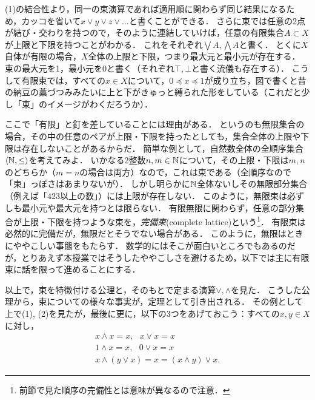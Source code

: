 \documentclass[11pt,a4paper, dvipdfmx]{jsarticle}
\begin{document}
(1)の結合性より，同一の束演算であれば適用順に関わらず同じ結果になるため，カッコを省いて$x \vee y \vee z \vee \dots$と書くことができる．
さらに束では任意の2点が結び・交わりを持つので，そのように連結していけば，任意の有限集合$A \subset X$が上限と下限を持つことがわかる．
これをそれぞれ$\bigvee A, \bigwedge A$と書く．
とくに$X$自体が有限の場合，$X$全体の上限と下限，つまり最大元と最小元が存在する．
束の最大元を1，最小元を0と書く（それぞれ$\top, \bot$と書く流儀も存在する）．
こうして有限束では，すべての$x \in X$について，$0 \preceq x \preceq 1$が成り立ち，図で書くと昔の納豆の藁づつみみたいに上と下がきゅっと縛られた形をしている（これだと少し「束」のイメージがわくだろうか）．

\begin{attn}
ここで「有限」と釘を差していることには理由がある．
というのも無限集合の場合，その中の任意のペアが上限・下限を持ったとしても，集合全体の上限や下限は存在しないことがあるからだ．
簡単な例として，自然数全体の全順序集合$\langle \mathbb{N}, \leq \rangle$を考えてみよ．
いかなる2整数$n, m \in \mathbb{N}$について，その上限・下限は$m,n$のどちらか（$m=n$の場合は両方）なので，これは束である（全順序なので「束」っぽさはあまりないが）．
しかし明らかに$\mathbb{N}$全体ないしその無限部分集合（例えば「$423$以上の数」）には上限が存在しない．
このように，無限束は必ずしも最小元や最大元を持つとは限らない．
有限無限に関わらず，任意の部分集合が上限・下限を持つような束を，\emph{完備束}(complete lattice)という\footnote{前節で見た順序の完備性とは意味が異なるので注意．}．
有限束は必然的に完備だが，無限だとそうでない場合がある．
このように，無限はときにややこしい事態をもたらす．
数学的にはそこが面白いところでもあるのだが，とりあえず本授業ではそうしたややこしさを避けるため，以下では主に有限束に話を限って進めることにする． 
\end{attn}

以上で，束を特徴付ける公理と，そのもとで定まる演算$\vee, \wedge$を見た．
こうした公理から，束についての様々な事実が，定理として引き出される．
その例として上で(1), (2)を見たが，最後に更に，以下の3つをあげておこう：すべての$x, y \in X$に対し，
\begin{align}
 x \wedge x = x, \ \ \ x \vee x = x \\
 1 \wedge x = x, \ \ \ 0 \vee x = x \\
 x \wedge (y \vee x) = x = (x \wedge y) \vee x .
\end{align}
\end{document}
